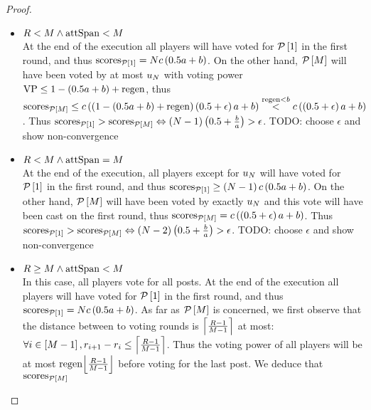 \begin{proof}
\begin{itemize}
    \begin{itemize}
      \item $\rounds < \postlen \wedge \attspan < \postlen$ \\
      At the end of the execution all players will have voted for
      $\postlist\left[1\right]$ in the first round, and thus
      $\mathrm{scores}_{\postlist\left[1\right]} = \playerlen c \left(0.5a +
      b\right)$. On the other hand, $\postlist\left[\postlen\right]$ will have
      been voted by at most $u_\playerlen$ with voting power $\votpow \leq 1 -
      \left(0.5a + b\right) + \regen$, thus \\
      $\mathrm{scores}_{\postlist\left[\postlen\right]} \leq c \left(\left(1 -
      \left(0.5a + b\right) + \regen\right)\left(0.5 + \epsilon\right)a +
      b\right) \overset{\regen < b}{<} c\left(\left(0.5 + \epsilon\right)a +
      b\right)$. Thus $\mathrm{scores}_{\postlist\left[1\right]} >
      \mathrm{scores}_{\postlist\left[\postlen\right]} \Leftrightarrow \left(N
      - 1\right)\left(0.5 + \frac{b}{a}\right) > \epsilon$. TODO: choose
      $\epsilon$ and show non-convergence

      \item $\rounds < \postlen \wedge \attspan = \postlen$ \\
      At the end of the execution, all players except for $u_\playerlen$ will
      have voted for $\postlist\left[1\right]$ in the first round, and thus
      $\mathrm{scores}_{\postlist\left[1\right]} \geq \left(\playerlen -
      1\right) c \left(0.5a + b\right)$. On the other hand,
      $\postlist\left[\postlen\right]$ will have been voted by exactly
      $u_\playerlen$ and this vote will have been cast on the first round, thus
      $\mathrm{scores}_{\postlist\left[\postlen\right]} = c\left(\left(0.5 +
      \epsilon\right)a + b\right)$. Thus
      $\mathrm{scores}_{\postlist\left[1\right]} >
      \mathrm{scores}_{\postlist\left[\postlen\right]} \Leftrightarrow \left(N
      - 2\right)\left(0.5 + \frac{b}{a}\right) > \epsilon$. TODO: choose
      $\epsilon$ and show non-convergence

      \item $\rounds \geq \postlen \wedge \attspan < \postlen$ \\
      In this case, all players vote for all posts.  At the end of the execution
      all players will have voted for $\postlist\left[1\right]$ in the first
      round, and thus $\mathrm{scores}_{\postlist\left[1\right]} = \playerlen c
      \left(0.5a + b\right)$. As far as $\postlist\left[\postlen\right]$ is
      concerned, we first observe that the distance between to voting rounds is
      $\ceil*{\frac{\rounds - 1}{\postlen - 1}}$ at most: $\forall i \in
      \left[M - 1\right], r_{i+1} - r_i \leq \ceil*{\frac{\rounds - 1}{\postlen
      - 1}}$. Thus the voting power of all players will be at most
      $\regen\floor*{\frac{\rounds - 1}{\postlen - 1}}$ before voting for the
      last post. We deduce that
      $\mathrm{scores}_{\postlist\left[\postlen\right]}$
      

\end{itemize}
\end{itemize}
\end{proof}
